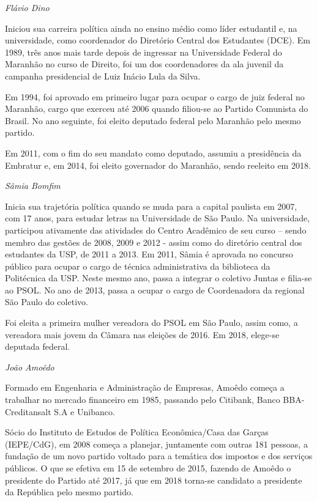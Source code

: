 \emph{Flávio Dino}

Iniciou sua carreira política ainda no ensino médio como líder
estudantil e, na universidade, como coordenador do Diretório Central dos
Estudantes (DCE). Em 1989, três anos mais tarde depois de ingressar na
Universidade Federal do Maranhão no curso de Direito, foi um dos
coordenadores da ala juvenil da campanha presidencial de Luiz Inácio
Lula da Silva.

Em 1994, foi aprovado em primeiro lugar para ocupar o cargo de juiz
federal no Maranhão, cargo que exerceu até 2006 quando filiou-se ao
Partido Comunista do Brasil. No ano seguinte, foi eleito deputado
federal pelo Maranhão pelo mesmo partido.

Em 2011, com o fim do seu mandato como deputado, assumiu a presidência
da Embratur e, em 2014, foi eleito governador do Maranhão, sendo
reeleito em 2018.

\emph{Sâmia Bomfim}

Inicia sua trajetória política quando se muda para a capital paulista em
2007, com 17 anos, para estudar letras na Universidade de São Paulo. Na
universidade, participou ativamente das atividades do Centro Acadêmico
de seu curso -- sendo membro das gestões de 2008, 2009 e 2012 - assim
como do diretório central dos estudantes da USP, de 2011 a 2013. Em
2011, Sâmia é aprovada no concurso público para ocupar o cargo de
técnica administrativa da biblioteca da Politécnica da USP. Neste mesmo
ano, passa a integrar o coletivo Juntas e filia-se ao PSOL. No ano de
2013, passa a ocupar o cargo de Coordenadora da regional São Paulo do
coletivo.

Foi eleita a primeira mulher vereadora do PSOL em São Paulo, assim como,
a vereadora mais jovem da Câmara nas eleições de 2016. Em 2018, elege-se
deputada federal.

\emph{João Amoêdo}

Formado em Engenharia e Administração de Empresas, Amoêdo começa a
trabalhar no mercado financeiro em 1985, passando pelo Citibank, Banco
BBA-Creditansalt S.A e Unibanco.

Sócio do Instituto de Estudos de Política Econômica/Casa das Garças
(IEPE/CdG), em 2008 começa a planejar, juntamente com outras 181
pessoas, a fundação de um novo partido voltado para a temática dos
impostos e dos serviços públicos. O que se efetiva em 15 de setembro de
2015, fazendo de Amoêdo o presidente do Partido até 2017, já que em 2018
torna-se candidato a presidente da República pelo mesmo partido.

